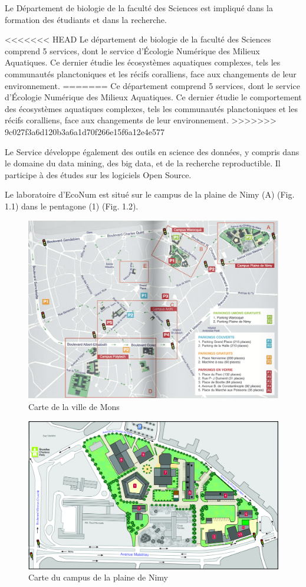 \documentclass[]{report}
\begin{document}
Le Département de biologie de la faculté des Sciences est impliqué dans
la formation des étudiants et dans la recherche.

<<<<<<< HEAD
Le département de biologie de la faculté des Sciences comprend 5
services, dont le service d'Écologie Numérique des Milieux Aquatiques.
Ce dernier étudie les écosystèmes aquatiques complexes, tels les
communautés planctoniques et les récifs coralliens, face aux changements
de leur environnement.
=======
Ce département comprend 5 services, dont le service d'Écologie Numérique
des Milieux Aquatiques. Ce dernier étudie le comportement des
écosystèmes aquatiques complexes, tels les communautés planctoniques et
les récifs coralliens, face aux changements de leur environnement.
>>>>>>> 9c027f3a6d120b3a6a1d70f266e15f6a12e4e577

Le Service développe également des outils en science des données, y
compris dans le domaine du data mining, des big data, et de la recherche
reproductible. Il participe à des études sur les logiciels Open Source.

Le laboratoire d'EcoNum est situé sur le campus de la plaine de Nimy (A)
(Fig. 1.1) dans le pentagone (1) (Fig. 1.2).

\begin{figure}
\centering
\includegraphics{../image/plan-campus.png}
\caption{Carte de la ville de Mons}
\end{figure}

\begin{figure}
\centering
\includegraphics{../image/plaine-Nimy.jpg}
\caption{Carte du campus de la plaine de Nimy}
\end{figure}
\end{document}
